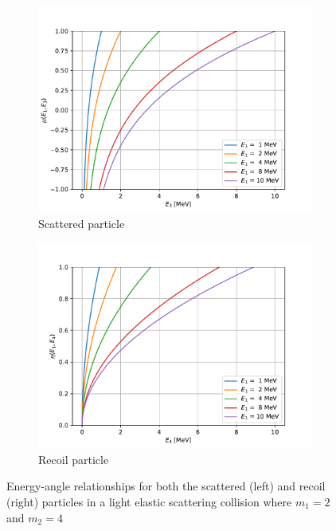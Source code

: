 \documentclass[../main.tex]{subfiles}
\begin{document}
\begin{figure}[!htb]
  \centering
  \begin{subfigure}{.5\textwidth}
    \centering
    \includegraphics[width=\linewidth]{../figures/particle_kinematics/light_energy_angle.pdf}
    \caption{Scattered particle}
    \label{fig:light-elastic-energy-angle-scattered}
  \end{subfigure}%
  \begin{subfigure}{.5\textwidth}
    \centering
    \includegraphics[width=\linewidth]{../figures/particle_kinematics/light_recoil_energy_angle.pdf}
    \caption{Recoil particle}
    \label{fig:light-elastic-energy-angle-recoil}
  \end{subfigure}
  \caption{Energy-angle relationships for both the scattered (left) and recoil (right) particles in a light elastic scattering collision where $m_1 = 2$ and $m_2 = 4$}
  \label{fig:light-elastic-energy-angle}
\end{figure}
\end{document}

